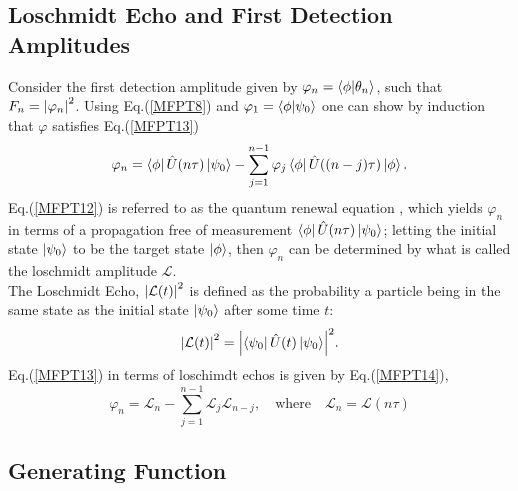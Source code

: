 \documentclass{article}
\numberwithin{equation}{section}
\newcommand{\1}{\mathbb{1}}
\newcommand{\state}{\ket{\phi}}
\newcommand{\projection}{\bra{\phi}}
\begin{document}
\subsection{Loschmidt Echo and First Detection Amplitudes}
Consider the first detection amplitude given by $\varphi_n=\projection\ket{\theta_n}$, such that $F_n=\abs{\varphi_n}^2$. Using Eq.(\ref{MFPT8}) and $\varphi_1=\projection\ket{\psi_0}$ one can show by induction that $\varphi$ satisfies Eq.(\ref{MFPT13})
\begin{equation}\label{MFPT13}
    \varphi_n=\projection\hat{U}(n\tau)\ket{\psi_0}-\sum_{j=1}^{n-1}\varphi_j\projection\hat{U}((n-j)\tau)\state.   
\end{equation}
Eq.(\ref{MFPT12}) is referred to as the quantum renewal equation \cite{barkai}, which yields $\varphi_n$ in terms of a propagation free of measurement $\projection\hat{U}(n\tau)\ket{\psi_0}$; letting the initial state $\ket{\psi_0}$ to be the target state $\state$, then $\varphi_n$ can be determined by what is called the loschmidt amplitude $\mathcal{L}$.
\\
The Loschmidt Echo, $\abs{\mathcal{L}(t)}^2$ is defined as the probability a particle being in the same state as the initial state $\ket{\psi_0}$ after some time $t$:
\begin{equation}
    \abs{\mathcal{L}(t)}^2=\abs{\bra{\psi_0}\hat{U}(t)\ket{\psi_0}}^2.
\end{equation}
Eq.(\ref{MFPT13}) in terms of loschimdt echos is given by Eq.(\ref{MFPT14}),
\begin{equation}\label{MFPT14}
    \varphi_n=\mathcal{L}_n-\sum_{j=1}^{n-1}\mathcal{L}_j\mathcal{L}_{n-j}, \quad \text{where} \quad \mathcal{L}_n=\mathcal{L}(n\tau)
\end{equation}
\subsection{Generating Function}
\end{document}

